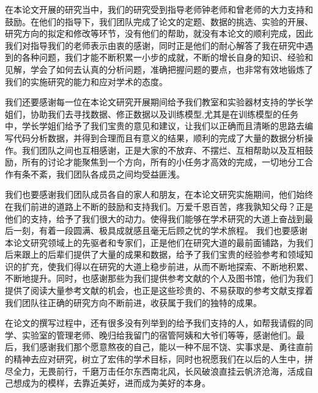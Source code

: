 
\makeacknowledgement

在本论文开展的研究当中，我们的研究受到指导老师钟老师和曾老师的大力支持和鼓励。在他们的指导下，我们团队完成了论文的定题、数据的挑选、实验的开展、研究方向的拟定和修改等环节，没有他们的帮助，就没有本论文的顺利完成，因此我们对指导我们的老师表示由衷的感谢，同时正是他们的耐心解答了我在研究中遇到的各种问题，我们才能不断积累一小步的成就，不断的增长自身的知识、经验和见解，学会了如何去认真的分析问题，准确把握问题的要点，也非常有效地锻炼了我们的实施研究的能力和应对学术的态度。

我们还要感谢每一位在本论文研究开展期间给予我们教室和实验器材支持的学长学姐们，协助我们去寻找数据、修正数据以及训练模型,尤其是在训练模型的任务中，学长学姐们给予了我们宝贵的意见和建议，让我们以正确而且清晰的思路去编写代码分析数据，并得到合理而且有意义的结果，顺利的完成了大量的数据分析操作。我们团队之间也互相感谢，正是大家的不放弃、不摆烂、互相帮助以及互相鼓励，所有的讨论才能聚焦到一个方向，所有的小任务才高效的完成，一切地分工合作有条不紊，我们团队各成员之间均受益匪浅。

我们也要感谢我们团队成员各自的家人和朋友，在本论文研究实施期间，他们始终在我们前进的道路上不断的鼓励和支持我们。万爱千恩百苦，疼我孰知父母？正是他们的支持，给予了我们很大的动力。使得我们能够在学术研究的大道上奋战到最后一刻，有着一段圆满、极具成就感且毫无后顾之忧的学术旅程。
我们也要感谢本论文研究领域上的先驱者和专家们，正是他们在研究大道的最前面铺路，为我们后来跟上的后辈们提供了大量的成果和数据，给予了我们宝贵的经验参考和领域知识的扩充，使我们得以在研究的大道上稳步前进，从而不断地探索、不断地积累、不断地提升。同时，也感谢那些为我们提供参考文献的个人及图书馆，他们为我们提供了阅读大量参考文献的机会，也正是这些珍贵的、不易获取的参考文献支撑着我们团队往正确的研究方向不断前进，收获属于我们的独特的成果。

在论文的撰写过程中，还有很多没有列举到的给予我们支持的人，如帮我请假的同学、实验室的管理老师、晚归给我留门的宿管阿姨和大爷们等等，感谢他们。最后，我们感谢我们那个愿意熬夜的自己，能以一种不屈不饶、实事求是、勇往直前的精神去应对研究，树立了宏伟的学术目标，同时也祝愿我们在以后的人生中，拼尽全力，无畏前行，千磨万击任尔东西南北风，长风破浪直挂云帆济沧海，活成自己想成为的模样，去靠近美好，进而成为美好的本身。


\vspace{3em}

